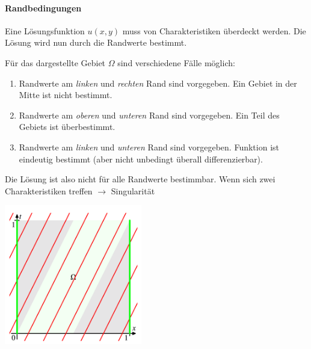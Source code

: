 \paragraph{Randbedingungen}
Eine Lösungsfunktion $u(x,y)$ muss von Charakteristiken überdeckt werden.
Die Lösung wird nun durch die Randwerte bestimmt.

\begin{minipage}{10cm}
    Für das dargestellte Gebiet $\Omega$ sind verschiedene Fälle möglich:
    \begin{enumerate}
        \item Randwerte am \emph{linken} und \emph{rechten} Rand sind vorgegeben.
        Ein Gebiet in der Mitte ist nicht bestimmt.
        \item Randwerte am \emph{oberen} und \emph{unteren} Rand sind vorgegeben.
        Ein Teil des Gebiets ist überbestimmt.
        \item Randwerte am \emph{linken} und \emph{unteren} Rand sind vorgegeben.
        Funktion ist eindeutig bestimmt (aber nicht unbedingt überall differenzierbar).
    \end{enumerate}
    Die Lösung ist also nicht für alle Randwerte bestimmbar. \newline
    Wenn sich zwei Charakteristiken treffen $\rightarrow$ Singularität
\end{minipage}
\hspace{0.5cm}
\begin{minipage}{8cm}
    \centering
    \includegraphics[width=6cm]{Content/01_theory/charakteristiken_randwerte.png}
\end{minipage}

